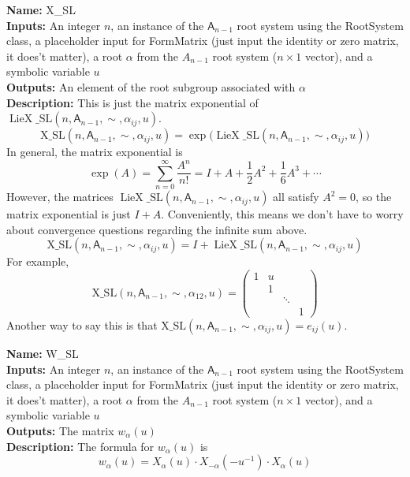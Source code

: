 \documentclass[12pt]{article}
\theoremstyle{definition}
\numberwithin{theorem}{subsection}
\newcommand{\lp}{\left(}
\newcommand{\rp}{\right)}
\newcommand{\tbf}{\textbf}
\newcommand{\noi}{\noindent}
\newcommand{\inv}{^{-1}}
\DeclareMathOperator{\LieX}{LieX}
\begin{document}
\begin{framed}
\noi \tbf{Name:} X\_SL \\
\noi \tbf{Inputs:} An integer $n$, an instance of the $\mathsf{A}_{n-1}$ root system using the RootSystem class, a placeholder input for FormMatrix (just input the identity or zero matrix, it does't matter), a root $\alpha$ from the $A_{n-1}$ root system ($n \times 1$ vector), and a symbolic variable $u$ \\
\noi \tbf{Outputs:} An element of the root subgroup associated with $\alpha$ \\
\noi \tbf{Description:} This is just the matrix exponential of $\LieX\_\text{SL}(n,\mathsf{A}_{n-1},\sim,\alpha_{ij}, u)$.
\[
	\text{X\_SL}(n,\mathsf{A}_{n-1},\sim,\alpha_{ij}, u) = \exp \Big(\LieX\_\text{SL}(n,\mathsf{A}_{n-1},\sim,\alpha_{ij}, u) \Big)
\]
In general, the matrix exponential is
\[
	\exp(A) = \sum_{n=0}^\infty \frac{A^n}{n!} = I + A + \frac 12 A^2 + \frac 16 A^3 + \cdots
\]
However, the matrices $\LieX\_\text{SL}(n,\mathsf{A}_{n-1},\sim,\alpha_{ij}, u)$ all satisfy $A^2 = 0$, so the matrix exponential is just $I+A$. Conveniently, this means we don't have to worry about convergence questions regarding the infinite sum above.
\[
	\text{X\_SL}(n,\mathsf{A}_{n-1},\sim,\alpha_{ij}, u) = I + \LieX\_\text{SL}(n,\mathsf{A}_{n-1},\sim,\alpha_{ij}, u)
\]
For example,
\[
	\text{X\_SL}(n,\mathsf{A}_{n-1},\sim,\alpha_{12}, u) =
	\begin{pmatrix}
		1 & u \\
		& 1 \\
		&& \ddots \\
		&&& 1
	\end{pmatrix}
\]
Another way to say this is that $\text{X\_SL}(n,\mathsf{A}_{n-1},\sim,\alpha_{ij}, u) = e_{ij}(u)$.
\end{framed}

\begin{framed}
\noi \tbf{Name:} W\_SL \\
\noi \tbf{Inputs:} An integer $n$, an instance of the $\mathsf{A}_{n-1}$ root system using the RootSystem class, a placeholder input for FormMatrix (just input the identity or zero matrix, it does't matter), a root $\alpha$ from the $A_{n-1}$ root system ($n \times 1$ vector), and a symbolic variable $u$ \\
\noi \tbf{Outputs:} The matrix $w_\alpha(u)$ \\
\noi \tbf{Description:} The formula for $w_\alpha(u)$ is
\[
	w_\alpha(u) = X_\alpha(u) \cdot X_{-\alpha} \lp - u \inv \rp \cdot X_\alpha(u)
\]
\end{framed}
\end{document}
